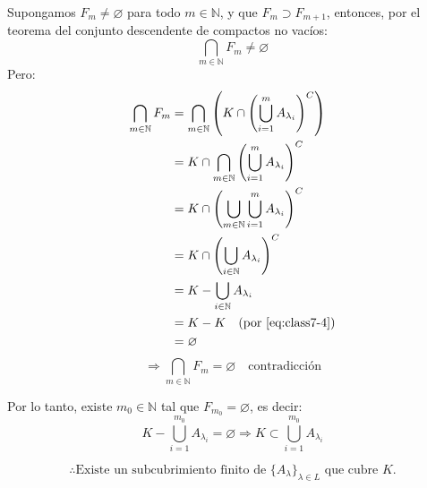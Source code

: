 {Supongamos \( F_m \neq \varnothing \) para todo \( m \in \mathbb{N} \), y que \( F_m \supset F_{m+1} \), entonces, por el teorema del conjunto descendente de compactos no vacíos:
\[
	\bigcap_{m \in \mathbb{N}} F_m \neq \varnothing
\]
Pero:
\begin{align*}
	\bigcap_{m \in \mathbb{N}} F_m
	 & = \bigcap_{m \in \mathbb{N}} \left( K \cap \left( \bigcup_{i = 1}^{m} A_{\lambda_i} \right)^C \right) \\
	 & = K \cap \bigcap_{m \in \mathbb{N}} \left( \bigcup_{i = 1}^{m} A_{\lambda_i} \right)^C                \\
	 & = K \cap \left( \bigcup_{m \in \mathbb{N}} \bigcup_{i = 1}^{m} A_{\lambda_i} \right)^C                \\
	 & = K \cap \left( \bigcup_{i \in \mathbb{N}} A_{\lambda_i} \right)^C                                    \\
	 & = K - \bigcup_{i \in \mathbb{N}} A_{\lambda_i}                                                        \\
	 & = K - K \quad \text{(por \eqref{eq:class7-4})}                                                        \\
	 & = \varnothing
\end{align*}
\[
	\Rightarrow \bigcap_{m \in \mathbb{N}} F_m = \varnothing \quad \text{contradicción}
\]

Por lo tanto, existe \( m_0 \in \mathbb{N} \) tal que \( F_{m_0} = \varnothing \), es decir:
\[
	K - \bigcup_{i=1}^{m_0} A_{\lambda_i} = \varnothing \Rightarrow K \subset \bigcup_{i=1}^{m_0} A_{\lambda_i}
\]

\[
	\therefore \text{Existe un subcubrimiento finito de } \{A_\lambda\}_{\lambda \in L} \text{ que cubre } K.
\]
}

